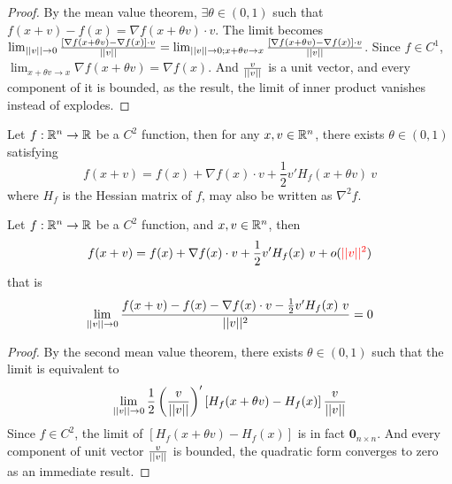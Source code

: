 \documentclass{article}
\begin{document}
    \begin{proof}
    	By the mean value theorem, $\exists \theta \in (0, 1)$ such that $f(x+v) - f(x) = \nabla f(x + \theta v) \cdot v$. The limit becomes $\lim_{\vert \vert {v} \vert \vert \to 0} \frac{[\nabla f(x + \theta v) - \nabla f(x)] \cdot v}{\vert \vert {v} \vert \vert} = \lim_{\vert \vert {v} \vert \vert \to 0; x + \theta v \to x} \frac{[\nabla f(x + \theta v) - \nabla f(x)] \cdot v}{\vert \vert {v} \vert \vert}$. Since $f \in C^1$, $\lim_{x + \theta v \to x} \nabla f(x + \theta v) = \nabla f(x)$. And $\frac{v}{\vert \vert {v} \vert \vert}$ is a unit vector, and every component of it is bounded, as the result, the limit of inner product vanishes instead of explodes.
    \end{proof}
    
    \begin{theorem}
        Let $f: \mathbb{R}^n \to \mathbb{R}$ be a $C^2$ function, then for any $x, v \in \mathbb{R}^n$, there exists $\theta \in (0, 1)$ satisfying
        \begin{equation}
            f(x + v) = f(x) + \nabla f(x) \cdot v + \frac{1}{2} v' H_f(x + \theta v)\ v
        \end{equation}
        where $H_f$ is the Hessian matrix of $f$, may also be written as $\nabla^2 f$.
    \end{theorem}
    
    \begin{proposition}
        Let $f: \mathbb{R}^n \to \mathbb{R}$ be a $C^2$ function, and $x, v \in \mathbb{R}^n$, then
        \begin{equation}
            f(x + v) = f(x) + \nabla f(x) \cdot v + \frac{1}{2} v' H_f(x)\ v + o(\textcolor{red}{\vert \vert {v} \vert \vert^2})
        \end{equation}
        that is
        \begin{equation}
            \lim_{\vert \vert {v} \vert \vert \to 0} \frac{
                f(x + v) - f(x) - \nabla f(x) \cdot v - \frac{1}{2} v' H_f(x)\ v
            }{\vert \vert {v} \vert \vert^2} = 0
        \end{equation}
    \end{proposition}
    
    \begin{proof}
    	By the second mean value theorem, there exists $\theta \in (0, 1)$ such that the limit is equivalent to
    	\begin{align}
    		\lim_{\vert \vert {v} \vert \vert \to 0} \frac{1}{2} \left(\frac{v}{\vert \vert {v} \vert \vert}\right)' \left[H_f(x + \theta v) - H_f(x)\right] \frac{v}{\vert \vert {v} \vert \vert}
    	\end{align}
    	Since $f \in C^2$, the limit of $\left[H_f(x + \theta v) - H_f(x)\right]$ is in fact $\textbf{0}_{n \times n}$. And every component of unit vector $\frac{v}{\vert \vert {v} \vert \vert}$ is bounded, the quadratic form converges to zero as an immediate result.
    \end{proof}
    
\end{document}
